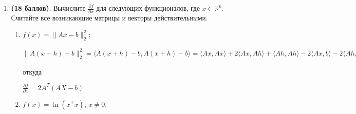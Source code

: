 \documentclass[a4paper, 11pt]{article}
\newcommand{\prob}[1]{\item \textbf{(#1 баллов)}.}
\begin{document}
\begin{enumerate}
\begin{enumerate}
				назовем все кроме первой матрицы m
				
				$= v_1 \bar \sigma_1 m_1 + \dots + v_r \bar \sigma_r m_r = 0$
				
				из того, что в свд унитарные матрицы и векторы из них составляют ОНБ, верхнее выполнено $iff$
				
				$\bar \sigma_1 m_1 + \dots +  \bar \sigma_r m_r = 0$
				
				Но сигмы не нулевые, тк это сигнулярные числа, а они будут нулю равны только начиная с r + 1
				
				Тогда m имеет вид:
				
				$\begin{pmatrix}
					0 \\
					0 \\
					\vdots \\
					m_{r + 1} \\
					m_{m} \\
				\end{pmatrix}$
			
				а это то, с чего мы начинали решение в другую сторону $\hfill \blacksquare$
				
				\item Если $P$ - ортопроектор на $ \mathrm{Im}(U_r) \implies I - P$ на $ \mathrm{Im}(U_r^\perp) =  \mathrm{ker}(A^*)$
				
				$Im(A) = Im(U_r) \implies (I - P) = (I - U_r U_r^*)$ (ну как в первом пракдз)

		\end{enumerate}

	\prob{18} Вычислите $\frac{\partial f}{\partial x}$ для следующих функционалов, где $x\in\mathbb{R}^n$. Считайте все возникающие матрицы и векторы действительными.
	\begin{enumerate}
		\item $f(x) = \|Ax - b\|_2^2$;
		
			$\|A(x + h) - b\|_2^2 = \langle A(x + h) - b, A(x + h) - b \rangle = \langle Ax, Ax \rangle + 2 \langle Ax, Ah \rangle + \langle Ah, Ah \rangle - 2 \langle Ax, b \rangle - 2 \langle Ah, b \rangle + \langle b, b \rangle = f(x) + \langle 2Ax - 2b, Ah \rangle + \langle Ah, Ah \rangle = f(x) + 2(x^T A^T - b^T )Ah + \bar o(\| h\|_2^2) $
			
			откуда 
			
			$\frac{\partial f}{\partial x} = 2A^T(AX - b)$
		
		\item $f(x) = \ln(x^\top x)$, $x\not=0$.
		

\end{enumerate}
\end{enumerate}
\end{document}
